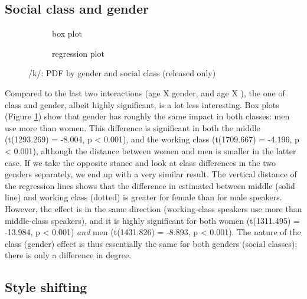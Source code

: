 \subsection{Social class and gender}
\label{sec.prod.res.con.k.classgender}

\begin{figure}[h]
	\centering
	\begin{subfigure}{.49\textwidth}
		\centering
			\resizebox{\linewidth}{!}{} 
		\caption{box plot}
		\label{fig.box.k.classgender}
	\end{subfigure}
	\begin{subfigure}{.49\textwidth}
		\centering
			\resizebox{\linewidth}{!}{} 
		\caption{regression plot}
		\label{fig.scatter.k.classgender}
	\end{subfigure}
	\caption{/k/: PDF by gender and social class (released only)}
\end{figure}

Compared to the last two interactions (age X gender, and age X ), the one of class and gender, albeit highly significant, is a lot less interesting.
Box plots (Figure \ref{fig.box.k.classgender}) show that gender has roughly the same impact in both classes: men use more  than women.
This difference is significant in both the middle (t(1293.269) = -8.004, p < 0.001), and the working class (t(1709.667) = -4.196, p < 0.001), although the distance between women and men is smaller in the latter case.
If we take the opposite stance and look at class differences in the two genders separately, we end up with a very similar result.
The vertical distance of the regression lines shows that the difference in estimated  between middle (solid line) and working class (dotted) is greater for female than for male speakers.
However, the effect is in the same direction (working-class speakers use more  than middle-class speakers), and it is highly significant for both women (t(1311.495) = -13.984, p < 0.001) \emph{and} men (t(1431.826) = -8.893, p < 0.001).
The nature of the class (gender) effect is thus essentially the same for both genders (social classes); there is only a difference in degree.

\subsection{Style shifting}
\label{sec.prod.res.con.k.shifting}

